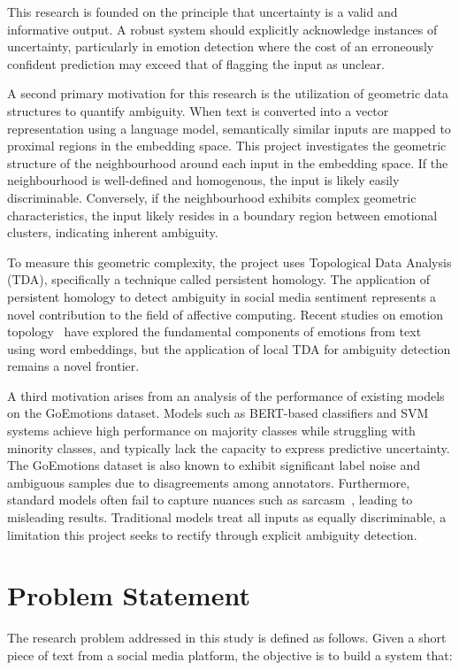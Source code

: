This research is founded on the principle that uncertainty is a valid and informative output. A robust system should explicitly acknowledge instances of uncertainty, particularly in emotion detection where the cost of an erroneously confident prediction may exceed that of flagging the input as unclear.

A second primary motivation for this research is the utilization of geometric data structures to quantify ambiguity. When text is converted into a vector representation using a language model, semantically similar inputs are mapped to proximal regions in the embedding space. This project investigates the geometric structure of the neighbourhood around each input in the embedding space. If the neighbourhood is well-defined and homogenous, the input is likely easily discriminable. Conversely, if the neighbourhood exhibits complex geometric characteristics, the input likely resides in a boundary region between emotional clusters, indicating inherent ambiguity.

To measure this geometric complexity, the project uses Topological Data Analysis (TDA), specifically a technique called persistent homology. The application of persistent homology to detect ambiguity in social media sentiment represents a novel contribution to the field of affective computing. Recent studies on emotion topology~\cite{emotion_topology} have explored the fundamental components of emotions from text using word embeddings, but the application of local TDA for ambiguity detection remains a novel frontier.

A third motivation arises from an analysis of the performance of existing models on the
GoEmotions dataset. Models such as BERT-based classifiers and SVM systems achieve
high performance on majority classes while struggling with minority classes, and
typically lack the capacity to express predictive uncertainty. The GoEmotions dataset
is also known to exhibit significant label noise and ambiguous samples due to
disagreements among annotators. Furthermore, standard models often fail to capture nuances such as sarcasm~\cite{sarcasm}, leading to misleading results. Traditional models treat all inputs as equally discriminable, a limitation this project seeks to rectify through explicit ambiguity detection.

\section{Problem Statement}
 
The research problem addressed in this study is defined as follows. Given a short piece of text
from a social media platform, the objective is to build a system that:
 
